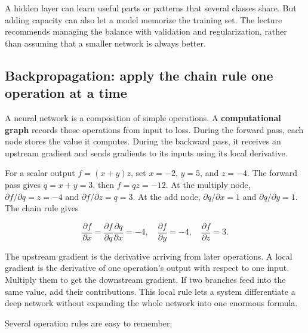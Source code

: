 A hidden layer can learn useful parts or patterns that several classes share. But adding capacity can also let a model memorize the training set. The lecture recommends managing the balance with validation and regularization, rather than assuming that a smaller network is always better.

\subsection{Backpropagation: apply the chain rule one operation at a time}\label{04-visual-computing-ii-ch031-backpropagation-apply-the-chain-rule-one-operation-at-a-time}

\hypertarget{04-visual-computing-ii-ch031-backpropagation-apply-the-chain-rule-one-operation-at-a-time}{}

A neural network is a composition of simple operations. A \textbf{computational graph} records those operations from input to loss. During the forward pass, each node stores the value it computes. During the backward pass, it receives an upstream gradient and sends gradients to its inputs using its local derivative.

For a scalar output \(f=(x+y)z\), set \(x=-2\), \(y=5\), and \(z=-4\). The forward pass gives \(q=x+y=3\), then \(f=qz=-12\). At the multiply node, \(\partial f/\partial q=z=-4\) and \(\partial f/\partial z=q=3\). At the add node, \(\partial q/\partial x=1\) and \(\partial q/\partial y=1\). The chain rule gives

\[\frac{\partial f}{\partial x}=\frac{\partial f}{\partial q}\frac{\partial q}{\partial x}=-4, \quad \frac{\partial f}{\partial y}=-4, \quad \frac{\partial f}{\partial z}=3.\]

The upstream gradient is the derivative arriving from later operations. A local gradient is the derivative of one operation's output with respect to one input. Multiply them to get the downstream gradient. If two branches feed into the same value, add their contributions. This local rule lets a system differentiate a deep network without expanding the whole network into one enormous formula.

Several operation rules are easy to remember:

